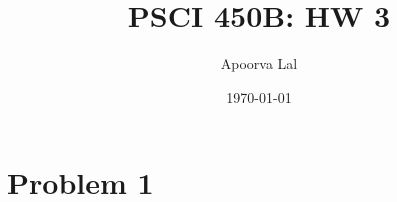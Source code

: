 \documentclass[12pt,reqno]{amsart}
\author{Apoorva Lal}
\title{PSCI 450B: HW 3}
\date{\today}
\begin{document}
\maketitle

\section*{Problem 1}

\lipsum
\end{document}
